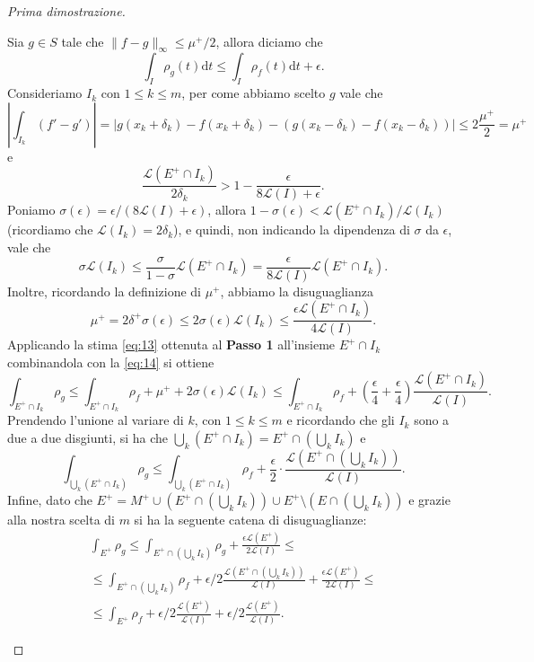 \documentclass[a4paper,11pt]{book}
\theoremstyle{plain}
\theoremstyle{definition}
\theoremstyle{remark}
\newcommand{\LL}{\mathscr{L}}
\newcommand{\norm}[1]{\lVert#1\rVert}
\newcommand{\diff}{\text{d}}
\begin{document}
\begin{proof}[Prima dimostrazione]
\begin{description}
		Sia $g\in S$ tale che $\norm{f-g}_{\infty}\leq \mu^+/2$, allora diciamo che
		\[
			\int_I\rho_g(t)\diff t\leq \int_I\rho_f(t)\diff t+\epsilon.
		\]
		Consideriamo $I_k$ con $1\leq k\leq m$, per come abbiamo scelto $g$ vale che
		\[
			\left|\int_{I_k}(f'-g')\right|=|g(x_k+\delta_k)-f(x_k+\delta_k)-(g(x_k-\delta_k)-f(x_k-\delta_k))|\leq 2\frac{\mu^+}{2}=\mu^+
		\]
		e
		\[
			\frac{\LL(E^+\cap I_k)}{2\delta_k}>1-\frac{\epsilon}{8\LL(I)+\epsilon}.
		\]
		Poniamo $\sigma(\epsilon) = \epsilon/(8\LL(I)+\epsilon)$, allora $1-\sigma(\epsilon) < \LL(E^+\cap I_k)/\LL(I_k)$ (ricordiamo che $\LL(I_k) = 2\delta_k$), e quindi, non indicando la dipendenza di $\sigma$ da $\epsilon$, vale che
		\begin{equation}\label{eq:14}
			\sigma\LL(I_k)\leq \frac{\sigma}{1-\sigma}\LL(E^+\cap I_k)=\frac{\epsilon}{8\LL(I)}\LL(E^+\cap I_k).
		\end{equation}
		Inoltre, ricordando la definizione di $\mu^+$, abbiamo la disuguaglianza
		\[
			\mu^+=2\delta^+\sigma(\epsilon)\leq 2\sigma(\epsilon)\LL(I_k)\leq \frac{\epsilon\LL(E^+\cap I_k)}{4\LL(I)}.
		\]
		Applicando la stima \eqref{eq:13} ottenuta al \textbf{Passo 1} all'insieme $E^+\cap I_k$ combinandola con la \eqref{eq:14} si ottiene
		\[
			\int_{E^+\cap I_k}\rho_g\leq\int_{E^+\cap I_k}\rho_f+\mu^++2\sigma(\epsilon)\LL(I_k)\leq \int_{E^+\cap I_k}\rho_f+\left(\frac{\epsilon}{4}+\frac{\epsilon}{4}\right)\frac{\LL(E^+\cap I_k)}{\LL(I)}.
		\]
		Prendendo l'unione al variare di $k$, con $1\leq k\leq m$ e ricordando che gli $I_k$ sono a due a due disgiunti, si ha che $\bigcup_k(E^+\cap I_k) = E^+\cap\left(\bigcup_k I_k\right)$ e
		\[
			\int_{\bigcup_k (E^+\cap I_k)}\rho_g\leq\int_{\bigcup_k (E^+\cap I_k)}\rho_f+\frac{\epsilon}{2}\cdot\frac{\LL\left(E^+\cap\left(\bigcup_k I_k\right)\right)}{\LL(I)}.
		\]
		Infine, dato che $E^+=M^+\cup\left(E^+\cap\left(\bigcup_k I_k\right)\right)\cup E^+\setminus\left(E\cap\left(\bigcup_k I_k\right)\right)$ e grazie alla nostra scelta di $m$ si ha la seguente catena di disuguaglianze:
		\begin{gather*}
			\int_{E^+}\rho_g \leq \int_{E^+\cap\left(\bigcup_k I_k\right)}\rho_g+\frac{\epsilon\LL(E^+)}{2\LL(I)}\leq\\
			\leq \int_{E^+\cap\left(\bigcup_k I_k\right)}\rho_f+\epsilon/2\frac{\LL\left(E^+\cap\left(\bigcup_k I_k\right)\right)}{\LL(I)}+\frac{\epsilon\LL(E^+)}{2\LL(I)}\leq\\
			\leq\int_{E^+}\rho_f+\epsilon/2\frac{\LL(E^+)}{\LL(I)}+\epsilon/2\frac{\LL(E^+)}{\LL(I)}.
		\end{gather*}

\end{description}
\end{proof}
\end{document}
